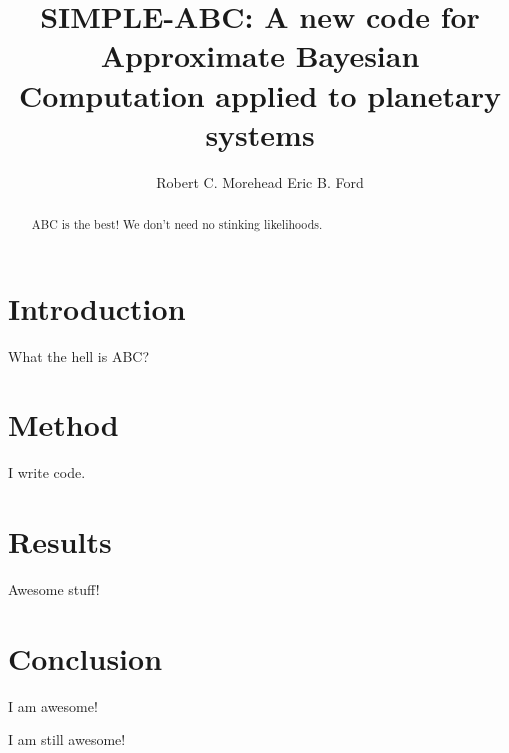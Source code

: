 \documentclass[]{emulateapj}
\begin{document}
\title{SIMPLE-ABC: A new code for Approximate Bayesian Computation applied to planetary systems}


\author{Robert C. Morehead Eric B. Ford}  



\begin{abstract}
ABC is the best! We don't need no stinking likelihoods. 
\end{abstract}

\section{Introduction}
\label{label:intro}
What the hell is ABC?


\section{Method}
\label{label:intro}
I write code.

\section{Results}
\label{label:results}
Awesome stuff!

\section{Conclusion}
\label{label:con}
I am awesome! 


\acknowledgments
I am still awesome! 


\end{document}
